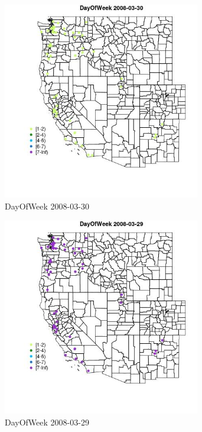 \begin{figure} 
\centering  
\includegraphics[width=0.77\textwidth]{Code_Outputs/Report_ML_input_PM25_Step4_part_e_de_duplicated_aves_MapObsDayOfWeek2008-03-30.jpg} 
\caption{\label{fig:Report_ML_input_PM25_Step4_part_e_de_duplicated_avesMapObsDayOfWeek2008-03-30}DayOfWeek 2008-03-30} 
\end{figure} 
 

\begin{figure} 
\centering  
\includegraphics[width=0.77\textwidth]{Code_Outputs/Report_ML_input_PM25_Step4_part_e_de_duplicated_aves_MapObsDayOfWeek2008-03-29.jpg} 
\caption{\label{fig:Report_ML_input_PM25_Step4_part_e_de_duplicated_avesMapObsDayOfWeek2008-03-29}DayOfWeek 2008-03-29} 
\end{figure} 
 

